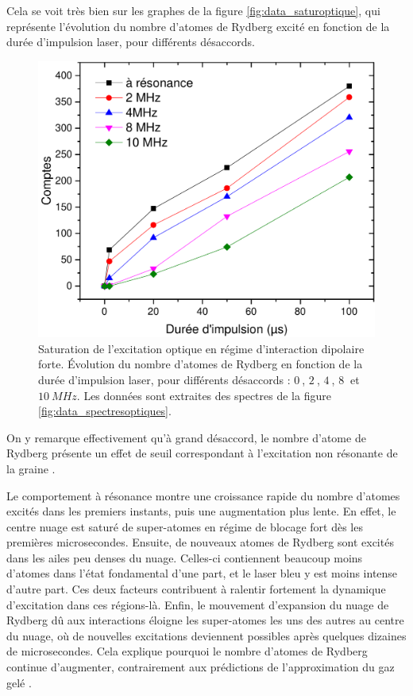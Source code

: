 Cela se voit très bien sur les graphes de la figure \eqref{fig:data_saturoptique}, qui représente l'évolution du nombre d'atomes de Rydberg excité en fonction de la durée d'impulsion laser, pour différents désaccords.
%
\begin{figure}[!h]
\centering
\includegraphics[width=.7\linewidth]{figures/low_l/satur_spectres_optiques_extract}
\caption[Saturation de l'excitation optique en régime d'interaction dipolaire forte]{Saturation de l'excitation optique en régime d'interaction dipolaire forte.
Évolution du nombre d'atomes de Rydberg en fonction de la durée d'impulsion laser, pour différents désaccords : $\SI{0}{}$, $\SI{2}{}$, $\SI{4}{}$, $\SI{8}{}$ et $\SI{10}{MHz}$.
Les données sont extraites des spectres de la figure \eqref{fig:data_spectresoptiques}.
}
\label{fig:data_saturoptique}
\end{figure}
%
On y remarque effectivement qu'à grand désaccord, le nombre d'atome de Rydberg présente un effet de seuil correspondant à l'excitation non résonante de la \og graine \fg{}.

Le comportement à résonance montre une croissance rapide du nombre d'atomes excités dans les premiers instants, puis une augmentation plus lente.
En effet, le centre nuage est saturé de super-atomes en régime de blocage fort dès les premières microsecondes.
Ensuite, de nouveaux atomes de Rydberg sont excités dans les ailes peu denses du nuage.
Celles-ci contiennent beaucoup moins d'atomes dans l'état fondamental d'une part, et le laser bleu y est moins intense d'autre part.
Ces deux facteurs contribuent à ralentir fortement la dynamique d'excitation dans ces régions-là.
Enfin, le mouvement d'expansion du nuage de Rydberg dû aux interactions éloigne les super-atomes les uns des autres au centre du nuage, où de nouvelles excitations deviennent possibles après quelques dizaines de microsecondes.
Cela explique pourquoi le nombre d'atomes de Rydberg continue d'augmenter, contrairement aux prédictions de l'approximation du \og gaz gelé \fg{}.%

